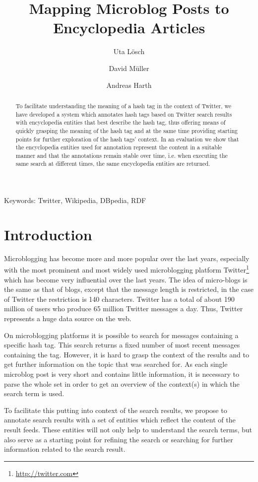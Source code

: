 \documentclass{llncs}
\title{Mapping Microblog Posts to Encyclopedia Articles}
\author{Uta L\"{o}sch \and David M\"{u}ller \and Andreas Harth}
\institute{
	Karlsruhe Institute of Technology (KIT), D-76131 Karlsruhe, Germany\\ 
	\email{uta.loesch@kit.edu},\\
	\email{david.mueller@student.kit.edu},\\
	\email{harth@kit.edu}
}
\newcommand{\nop}[1]{}
\begin{document}
\maketitle

\begin{abstract}
To facilitate understanding the meaning of a hash tag in the context of Twitter, we have developed a system which annotates hash tags based on Twitter search results with encyclopedia entities that best describe the hash tag, thus offering means of quickly grasping the meaning of the hash tag and at the same time providing starting points for further exploration of the hash tags' context. In an evaluation we show that the encyclopedia entities used for annotation represent the content in a suitable manner and that the annotations remain stable over time, i.e. when executing the same search at different times, the same encyclopedia entities are returned.
\end{abstract}

Keywords: Twitter, Wikipedia, DBpedia, RDF

\nop{
http://tagdef.com/ has a list of popular tags
}

\section{Introduction}

Microblogging has become more and more popular over the last years, especially with the most prominent and most widely used microblogging platform Twitter\footnote{\url{http://twitter.com}} which has become very influential over the last years. The idea of micro-blogs is the same as that of blogs, except that the message length is restricted, in the case of Twitter the restriction is 140 characters. Twitter has a total of about 190 million of users who produce 65 million Twitter messages a day. Thus, Twitter represents a huge data source on the web.

On microblogging platforms it is possible to search for messages containing a specific hash tag. This search returns a fixed number of most recent messages containing the tag. However, it is hard to grasp the context of the results and to get further information on the topic that was searched for. As each single microblog post is very short and contains little information, it is necessary to parse the whole set in order to get an overview of the context(s) in which the search term is used. 

To facilitate this putting into context of the search results, we propose to annotate search results with a set of entities which reflect the content of the result feeds. These entities will not only help to understand the search terms, but also serve as a starting point for refining the search or searching for further information related to the search result.
\end{document}
